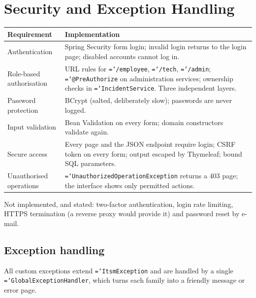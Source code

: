 \documentclass[11pt,a4paper]{article}
\newcommand{\code}[1]{\texttt{\hyphenchar\font=`\-\relax #1}}
\begin{document}
\section{Security and Exception Handling}\label{sec:security}
\begin{tabularx}{\linewidth}{@{}L{3.6cm}Y@{}}
\toprule
\textbf{Requirement} & \textbf{Implementation} \\
\midrule
Authentication & Spring Security form login; invalid login returns to the login page; disabled accounts cannot log in. \\
Role-based authorisation & URL rules for \code{/employee}, \code{/tech}, \code{/admin}; \code{@PreAuthorize} on administration services; ownership checks in \code{IncidentService}. Three independent layers. \\
Password protection & BCrypt (salted, deliberately slow); passwords are never logged. \\
Input validation & Bean Validation on every form; domain constructors validate again. \\
Secure access & Every page and the JSON endpoint require login; CSRF token on every form; output escaped by Thymeleaf; bound SQL parameters. \\
Unauthorised operations & \code{UnauthorizedOperationException} returns a 403 page; the interface shows only permitted actions. \\
\bottomrule
\end{tabularx}

Not implemented, and stated: two-factor authentication, login rate limiting, HTTPS termination (a reverse proxy would provide it) and password reset by e-mail.

\subsection{Exception handling}
All custom exceptions extend \code{ItsmException} and are handled by a single \code{GlobalExceptionHandler}, which turns each family into a friendly message or error page.
\end{document}
